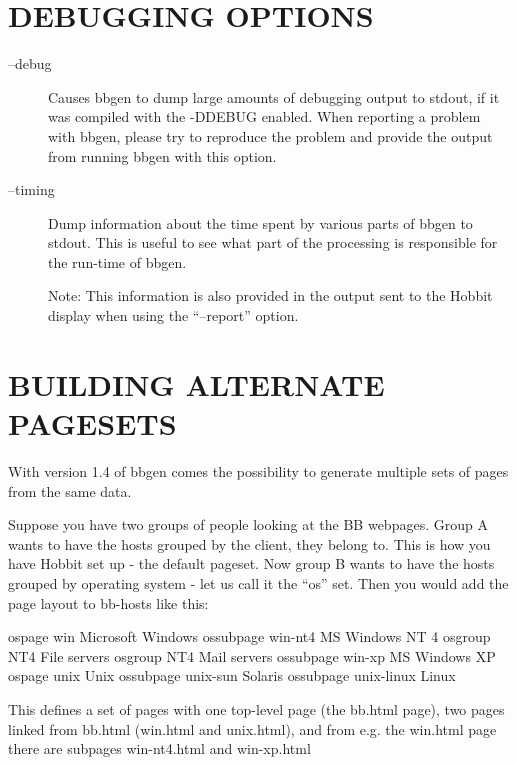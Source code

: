 \section{DEBUGGING OPTIONS}


 \begin{description}
\item[--debug] Causes bbgen to dump large amounts of debugging output
  to stdout, if it was compiled with the -DDEBUG enabled. When
  reporting a problem with bbgen, please try to reproduce the problem
  and provide the output from running bbgen with this option. 


 

\item[--timing] Dump information about the time spent by various parts
  of bbgen to stdout. This is useful to see what part of the
  processing is responsible for the run-time of bbgen.  

 Note: This information is also provided in the output sent to the Hobbit display when using the ``--report'' option. 

 


 


\end{description}

\section{BUILDING ALTERNATE PAGESETS}
 With version 1.4 of bbgen comes the possibility to generate multiple
 sets of pages from the same data.  

 Suppose you have two groups of people looking at the BB
 webpages. Group A wants to have the hosts grouped by the client, they
 belong to. This is how you have Hobbit set up - the default
 pageset. Now group B wants to have the hosts grouped by operating
 system - let us call it the ``os'' set. Then you would add the page
 layout to bb-hosts like this: 


 ospage win Microsoft Windows  
 ossubpage win-nt4 MS Windows NT 4  
 osgroup NT4 File servers  
 osgroup NT4 Mail servers  
 ossubpage win-xp MS Windows XP  
 ospage unix Unix  
 ossubpage unix-sun Solaris  
 ossubpage unix-linux Linux 


  This defines a set of pages with one top-level page (the bb.html
  page), two pages linked from bb.html (win.html and unix.html), and
  from e.g. the win.html page there are subpages win-nt4.html and
  win-xp.html  

